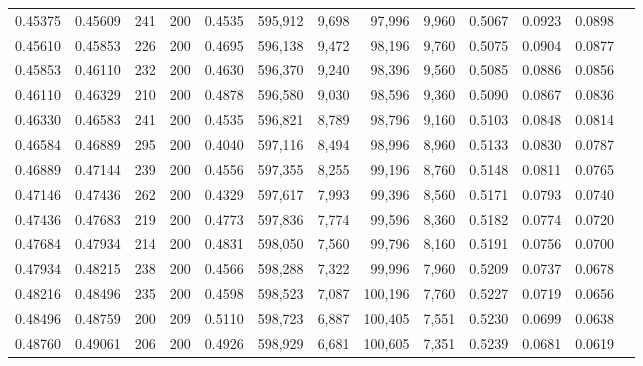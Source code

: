 \begin{tabular}{rrrrrrrrrrrrr}
0.45375 & 0.45609 &   241 & 200 &                                     0.4535 & 595,912 &   9,698 &  97,996 &   9,960 & 0.5067 & 0.0923 & 0.0898 \\
0.45610 & 0.45853 &   226 & 200 &                                     0.4695 & 596,138 &   9,472 &  98,196 &   9,760 & 0.5075 & 0.0904 & 0.0877 \\
0.45853 & 0.46110 &   232 & 200 &                                     0.4630 & 596,370 &   9,240 &  98,396 &   9,560 & 0.5085 & 0.0886 & 0.0856 \\
0.46110 & 0.46329 &   210 & 200 &                                     0.4878 & 596,580 &   9,030 &  98,596 &   9,360 & 0.5090 & 0.0867 & 0.0836 \\
0.46330 & 0.46583 &   241 & 200 &                                     0.4535 & 596,821 &   8,789 &  98,796 &   9,160 & 0.5103 & 0.0848 & 0.0814 \\
0.46584 & 0.46889 &   295 & 200 &                                     0.4040 & 597,116 &   8,494 &  98,996 &   8,960 & 0.5133 & 0.0830 & 0.0787 \\
0.46889 & 0.47144 &   239 & 200 &                                     0.4556 & 597,355 &   8,255 &  99,196 &   8,760 & 0.5148 & 0.0811 & 0.0765 \\
0.47146 & 0.47436 &   262 & 200 &                                     0.4329 & 597,617 &   7,993 &  99,396 &   8,560 & 0.5171 & 0.0793 & 0.0740 \\
0.47436 & 0.47683 &   219 & 200 &                                     0.4773 & 597,836 &   7,774 &  99,596 &   8,360 & 0.5182 & 0.0774 & 0.0720 \\
0.47684 & 0.47934 &   214 & 200 &                                     0.4831 & 598,050 &   7,560 &  99,796 &   8,160 & 0.5191 & 0.0756 & 0.0700 \\
0.47934 & 0.48215 &   238 & 200 &                                     0.4566 & 598,288 &   7,322 &  99,996 &   7,960 & 0.5209 & 0.0737 & 0.0678 \\
0.48216 & 0.48496 &   235 & 200 &                                     0.4598 & 598,523 &   7,087 & 100,196 &   7,760 & 0.5227 & 0.0719 & 0.0656 \\
0.48496 & 0.48759 &   200 & 209 &                                     0.5110 & 598,723 &   6,887 & 100,405 &   7,551 & 0.5230 & 0.0699 & 0.0638 \\
0.48760 & 0.49061 &   206 & 200 &                                     0.4926 & 598,929 &   6,681 & 100,605 &   7,351 & 0.5239 & 0.0681 & 0.0619 \\

\end{tabular}
